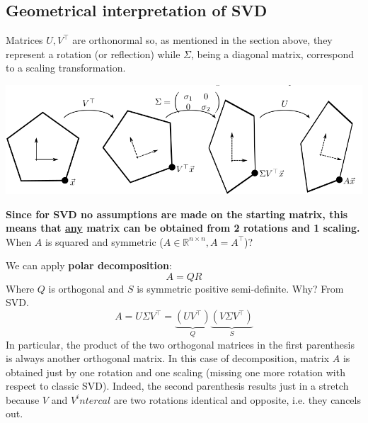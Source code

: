 \subsection{Geometrical interpretation of SVD}
Matrices $U, V^\intercal$ are orthonormal so, as mentioned in the section above, they represent a rotation (or reflection) while $\Sigma$, being a diagonal matrix, correspond to a scaling transformation. 
\begin{center}
    \includegraphics[scale=0.4]{../images/SVD_Geometric_Interpretation.png}
\end{center}
\textbf{Since for SVD no assumptions are made on the starting matrix, this means that \underline{any} matrix can be obtained from 2 rotations and 1 scaling.}\\

When $A$ is squared and symmetric ($A \in \mathbb{R}^{n\times n}, A=A^\intercal$)?

We can apply \textbf{polar decomposition}:
\[
A = QR    
\]
Where $Q$ is orthogonal and $S$ is symmetric positive semi-definite. Why? From SVD. 
\[
    A = U\Sigma V^\intercal = \underbrace{(UV^\intercal)}_{Q}\underbrace{(V\Sigma V^\intercal)}_{S}    
\]
In particular, the product of the two orthogonal matrices in the first parenthesis is always another orthogonal matrix. In this case of decomposition, matrix $A$ is obtained just by one rotation and one scaling (missing one more rotation with respect to classic SVD). Indeed, the second parenthesis results just in a stretch because $V$ and $V^intercal$ are two rotations identical and opposite, i.e. they cancels out. 

